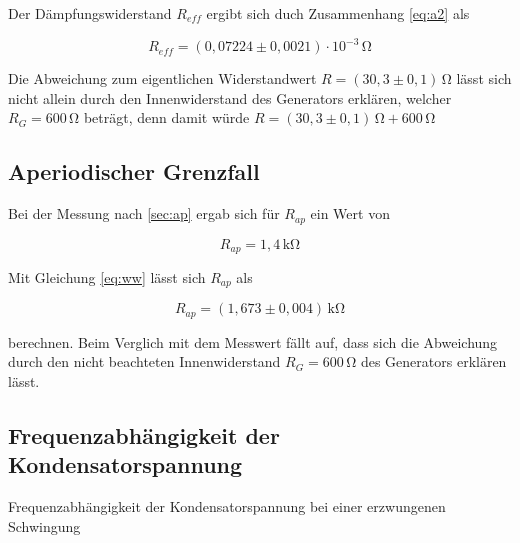 \noindent Der Dämpfungswiderstand $R_{eff}$ ergibt sich duch
Zusammenhang \ref{eq:a2} als

\begin{equation*}
  R_{eff}=(0,07224\pm0,0021)\cdot10^{-3}\,\si{\ohm}
\end{equation*}

\noindent Die Abweichung zum eigentlichen Widerstandwert $R=(30,3 \pm 0,1)\,\si{\ohm}$
lässt sich nicht allein durch den Innenwiderstand des Generators erklären,
welcher $R_G=600\,\si{\ohm}$ beträgt, denn damit würde $R=(30,3\pm0,1)\,\si{\ohm} + 600\,\si{\ohm}$





\subsection{Aperiodischer Grenzfall}
Bei der Messung nach \ref{sec:ap}
ergab sich für $R_{ap}$ ein Wert von

\begin{equation*}
  R_{ap}=1,4\,\si{\kilo\ohm}
\end{equation*}

\noindent Mit Gleichung \ref{eq:ww} lässt sich $R_{ap}$ 
als

\begin{equation*}
  R_{ap}=(1,673\pm0,004)\,\si{\kilo\ohm}
\end{equation*}

\noindent berechnen. Beim Verglich mit dem Messwert fällt 
auf, dass sich die Abweichung durch den nicht beachteten
Innenwiderstand $R_G=600\,\si{\ohm}$ des Generators erklären lässt.




\subsection{Frequenzabhängigkeit der Kondensatorspannung}

\begin{table}[H]
  \centering
  
  
  \caption{Frequenzabhängigkeit der Kondensatorspannung bei einer erzwungenen Schwingung}
  \label{tab:b}
\end{table}

